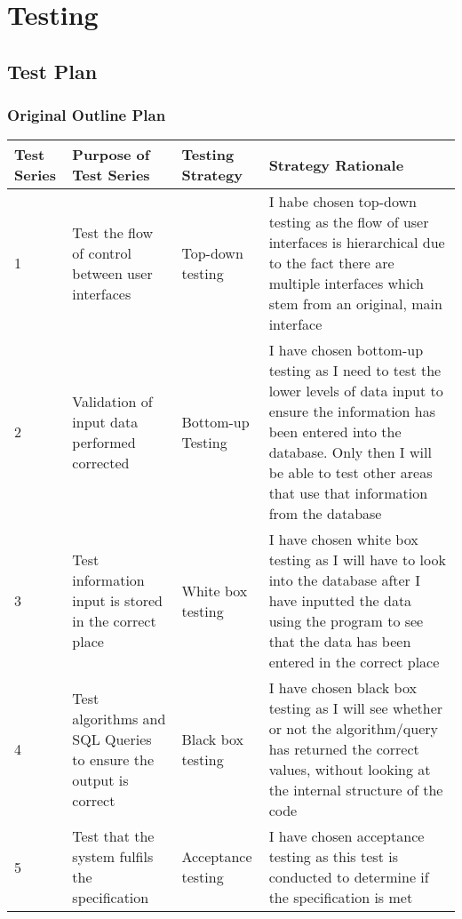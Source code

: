 \chapter{Testing}

\section{Test Plan}

\begin{landscape}
\subsection{Original Outline Plan}

\begin{center}
    \begin{tabular}{|p{2cm}|p{5cm}|p{5cm}|p{4cm}|}
        \hline
        \textbf{Test Series} & \textbf{Purpose of Test Series} & \textbf{Testing Strategy} & \textbf{Strategy Rationale}\\ \hline
1 & Test the flow of control between user interfaces & Top-down testing & I habe chosen top-down testing as the flow of user interfaces is hierarchical due to the fact there are multiple interfaces which stem from an original, main interface \\ \hline
2 & Validation of input data performed corrected & Bottom-up Testing & I have chosen bottom-up testing as I need to test the lower levels of data input to ensure the information has been entered into the database. Only then I will be able to test other areas that use that information from the database  \\ \hline
3 & Test information input is stored in the correct place & White box testing & I have chosen white box testing as I will have to look into the database after I have inputted the data using the program to see that the data has been entered in the correct place \\ \hline
4 & Test algorithms and SQL Queries to ensure the output is correct & Black box testing & I have chosen black box testing as I will see whether or not the algorithm/query has returned the correct values, without looking at the internal structure of the code \\ \hline
5 & Test that the system fulfils the specification & Acceptance testing & I have chosen acceptance testing as this test is conducted to determine if the specification is met \\ \hline


    \end{tabular}
\end{center}


\end{landscape}
